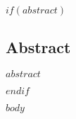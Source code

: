 \documentclass[final]{beamer}
\title
\author{ %
$if(author)$
$for(author)$
$author.name$\inst{$author.affiliation-label$}$sep$ \and $endfor$
$endif$
}
\institute{
$for(author)$
\inst{$author.affiliation-label$} $author.affiliation$
$endfor$
}
\date{$date$}
\begin{document}
\begin{frame}[t]
\begin{multicols}{3}


$if(abstract)$
\subsection{Abstract}

$abstract$

$endif$





$body$


\begin{footnotesize}






\end{footnotesize}

\end{multicols}

\end{frame}
\end{document}

